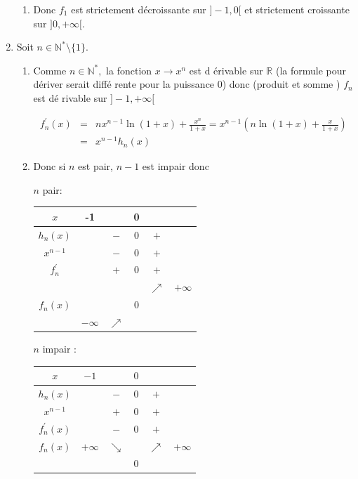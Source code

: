 \begin{correction}
\begin{enumerate}
\begin{enumerate}
\item Donc $f_{1}$ est strictement d\'{e}croissante sur $]-1,0[$ et
strictement croissante sur $]0,+\infty [.$
\end{enumerate}

\item Soit $n\in \mathbb{N}^{*}\setminus \{1\}$.

\begin{enumerate}
\item Comme $n\in \mathbb{N}^{*},$ la fonction $x\rightarrow x^{n}$ est d%
\'{e}rivable sur $\mathbb{R}$ (la formule pour d\'{e}river serait diff\'{e}%
rente pour la puissance 0) donc (produit et somme ) $f_{n}$ est d\'{e}%
rivable sur $]-1,+\infty [$

\begin{eqnarray*}
f_{n}^{\prime }(x) &=&nx^{n-1}\ln (1+x)+\frac{x^{n}}{1+x}=x^{n-1}\left( n\ln
\left( 1+x\right) +\frac{x}{1+x}\right) \\
&=&x^{n-1}h_{n}\left( x\right)
\end{eqnarray*}

\item Donc si $n$ est pair, $n-1$ est impair donc

$n$ pair: 
\begin{tabular}{|c|ccccc|}
\hline
$x$ & -1 &  & 0 &  &  \\ \hline
$h_{n}\left( x\right) $ &  & $-$ & 0 & $+$ &  \\ \hline
$x^{n-1}$ &  & $-$ & 0 & $+$ &  \\ \hline
$f_{n}^{\prime }$ &  & $+$ & 0 & $+$ &  \\ \hline
&  &  &  & $\nearrow $ & $+\infty $ \\ 
$f_{n}\left( x\right) $ &  &  & 0 &  &  \\ 
& $-\infty $ & $\nearrow $ &  &  &  \\ \hline
\end{tabular}
$n$ impair : 
\begin{tabular}{|c|ccccc|}
\hline
$x$ & $-1$ &  & $0$ &  &  \\ \hline
$h_{n}\left( x\right) $ &  & $-$ & $0$ & $+$ &  \\ \hline
$x^{n-1}$ &  & $+$ & $0$ & $+$ &  \\ \hline
$f_{n}^{\prime }\left( x\right) $ &  & $-$ & $0$ & $+$ &  \\ \hline
$f_{n}\left( x\right) $ & $+\infty $ & $\searrow $ &  & $\nearrow $ & $%
+\infty $ \\ 
&  &  & $0$ &  &  \\ \hline
\end{tabular}


\end{enumerate}
\end{enumerate}
\end{correction}
